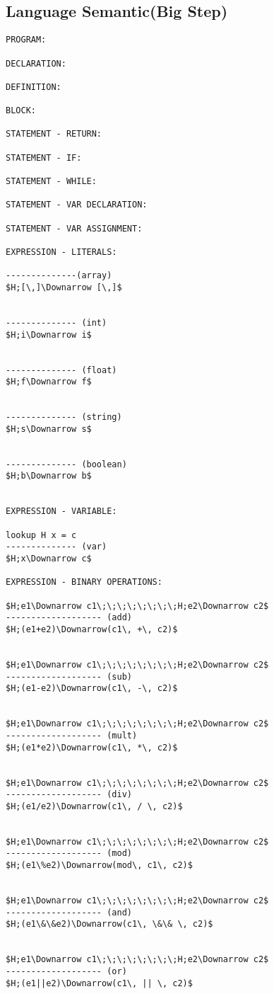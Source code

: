 \documentclass[11pt, a4paper]{article}
\begin{document}
\subsection*{Language Semantic(Big Step)}
\begin{lstlisting}
PROGRAM:

DECLARATION:

DEFINITION:

BLOCK:

STATEMENT - RETURN:

STATEMENT - IF:

STATEMENT - WHILE:

STATEMENT - VAR DECLARATION:

STATEMENT - VAR ASSIGNMENT:

EXPRESSION - LITERALS:

--------------(array)
$H;[\,]\Downarrow [\,]$


-------------- (int)
$H;i\Downarrow i$


-------------- (float)
$H;f\Downarrow f$


-------------- (string)
$H;s\Downarrow s$


-------------- (boolean)
$H;b\Downarrow b$


EXPRESSION - VARIABLE:

lookup H x = c
-------------- (var)
$H;x\Downarrow c$

EXPRESSION - BINARY OPERATIONS:

$H;e1\Downarrow c1\;\;\;\;\;\;\;\;H;e2\Downarrow c2$
------------------- (add)
$H;(e1+e2)\Downarrow(c1\, +\, c2)$


$H;e1\Downarrow c1\;\;\;\;\;\;\;\;H;e2\Downarrow c2$
------------------- (sub)
$H;(e1-e2)\Downarrow(c1\, -\, c2)$


$H;e1\Downarrow c1\;\;\;\;\;\;\;\;H;e2\Downarrow c2$
------------------- (mult)
$H;(e1*e2)\Downarrow(c1\, *\, c2)$


$H;e1\Downarrow c1\;\;\;\;\;\;\;\;H;e2\Downarrow c2$
------------------- (div)
$H;(e1/e2)\Downarrow(c1\, / \, c2)$


$H;e1\Downarrow c1\;\;\;\;\;\;\;\;H;e2\Downarrow c2$
------------------- (mod)
$H;(e1\%e2)\Downarrow(mod\, c1\, c2)$


$H;e1\Downarrow c1\;\;\;\;\;\;\;\;H;e2\Downarrow c2$
------------------- (and)
$H;(e1\&\&e2)\Downarrow(c1\, \&\& \, c2)$


$H;e1\Downarrow c1\;\;\;\;\;\;\;\;H;e2\Downarrow c2$
------------------- (or)
$H;(e1||e2)\Downarrow(c1\, || \, c2)$



\end{lstlisting}
\end{document}

